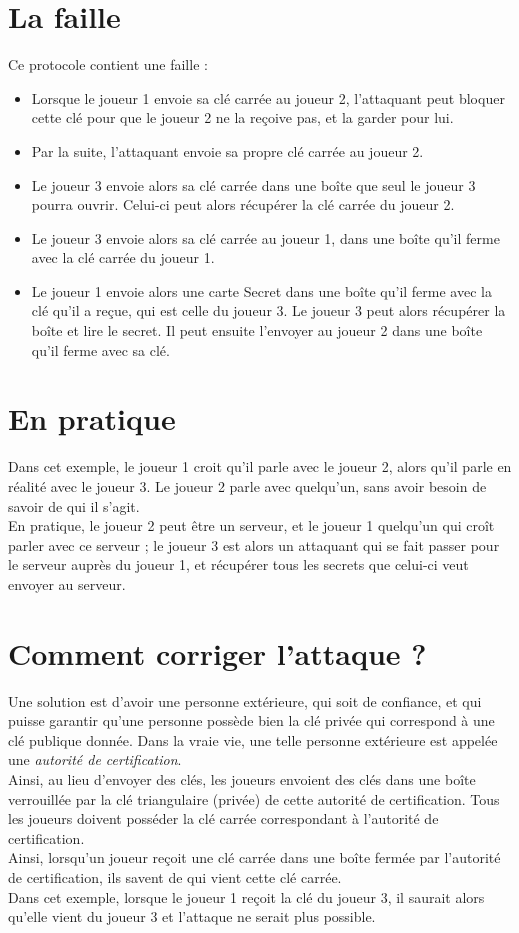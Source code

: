\documentclass[a4paper,10pt]{article}
\begin{document}
\section{La faille}
Ce protocole contient une faille :
\begin{itemize}
 \item Lorsque le joueur 1 envoie sa clé carrée au joueur 2, l'attaquant peut bloquer cette clé pour que le joueur 2 ne la reçoive pas, et la garder pour lui.
 \item Par la suite, l'attaquant envoie sa propre clé carrée au joueur 2.
 \item Le joueur 3 envoie alors sa clé carrée dans une boîte que seul le joueur 3 pourra ouvrir. Celui-ci peut alors récupérer la clé carrée du joueur 2.
 \item Le joueur 3 envoie alors sa clé carrée au joueur 1, dans une boîte qu'il ferme avec la clé carrée du joueur 1.
 \item Le joueur 1 envoie alors une carte Secret dans une boîte qu'il ferme avec la clé qu'il a reçue, qui est celle du joueur 3. Le joueur 3 peut alors récupérer la boîte et lire le secret. Il peut ensuite l'envoyer au joueur 2 dans une boîte qu'il ferme avec sa clé.
\end{itemize}

\section{En pratique}
Dans cet exemple, le joueur 1 croit qu'il parle avec le joueur 2, alors qu'il parle en réalité avec le joueur 3. Le joueur 2 parle avec quelqu'un, sans avoir besoin de savoir de qui il s'agit.\\
En pratique, le joueur 2 peut être un serveur, et le joueur 1 quelqu'un qui croît parler avec ce serveur ; le joueur 3 est alors un attaquant qui se fait passer pour le serveur auprès du joueur 1, et récupérer tous les secrets que celui-ci veut envoyer au serveur.

\section{Comment corriger l'attaque ?}
Une solution est d'avoir une personne extérieure, qui soit de confiance, et qui puisse garantir qu'une personne possède bien la clé privée qui correspond à une clé publique donnée. Dans la vraie vie, une telle personne extérieure est appelée une \emph{autorité de certification}.\\  Ainsi, au lieu d'envoyer des clés, les joueurs envoient des clés dans une boîte verrouillée par la clé triangulaire (privée) de cette autorité de certification. Tous les joueurs doivent posséder la clé carrée correspondant à l'autorité de certification.\\ Ainsi, lorsqu'un joueur reçoit une clé carrée dans une boîte fermée par l'autorité de certification, ils savent de qui vient cette clé carrée.\\
Dans cet exemple, lorsque le joueur 1 reçoit la clé du joueur 3, il saurait alors qu'elle vient du joueur 3 et l'attaque ne serait plus possible.
\end{document}
